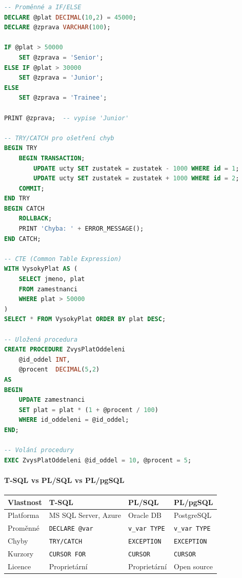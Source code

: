 \begin{lstlisting}[language=SQL, caption=T-SQL -- ukázka procedurálních prvků]
-- Proměnné a IF/ELSE
DECLARE @plat DECIMAL(10,2) = 45000;
DECLARE @zprava VARCHAR(100);

IF @plat > 50000
    SET @zprava = 'Senior';
ELSE IF @plat > 30000
    SET @zprava = 'Junior';
ELSE
    SET @zprava = 'Trainee';

PRINT @zprava;  -- vypise 'Junior'

-- TRY/CATCH pro ošetření chyb
BEGIN TRY
    BEGIN TRANSACTION;
        UPDATE ucty SET zustatek = zustatek - 1000 WHERE id = 1;
        UPDATE ucty SET zustatek = zustatek + 1000 WHERE id = 2;
    COMMIT;
END TRY
BEGIN CATCH
    ROLLBACK;
    PRINT 'Chyba: ' + ERROR_MESSAGE();
END CATCH;

-- CTE (Common Table Expression)
WITH VysokyPlat AS (
    SELECT jmeno, plat
    FROM zamestnanci
    WHERE plat > 50000
)
SELECT * FROM VysokyPlat ORDER BY plat DESC;

-- Uložená procedura
CREATE PROCEDURE ZvysPlatOddeleni
    @id_oddel INT,
    @procent  DECIMAL(5,2)
AS
BEGIN
    UPDATE zamestnanci
    SET plat = plat * (1 + @procent / 100)
    WHERE id_oddeleni = @id_oddel;
END;

-- Volání procedury
EXEC ZvysPlatOddeleni @id_oddel = 10, @procent = 5;
\end{lstlisting}

\paragraph{T-SQL vs PL/SQL vs PL/pgSQL}
\begin{center}
\begin{tabular}{llll}
\toprule
\textbf{Vlastnost} & \textbf{T-SQL} & \textbf{PL/SQL} & \textbf{PL/pgSQL} \\
\midrule
Platforma & MS SQL Server, Azure & Oracle DB & PostgreSQL \\
Proměnné & \texttt{DECLARE @var} & \texttt{v\_var TYPE} & \texttt{v\_var TYPE} \\
Chyby & \texttt{TRY/CATCH} & \texttt{EXCEPTION} & \texttt{EXCEPTION} \\
Kurzory & \texttt{CURSOR FOR} & \texttt{CURSOR} & \texttt{CURSOR} \\
Licence & Proprietární & Proprietární & Open source \\
\bottomrule
\end{tabular}
\end{center}

